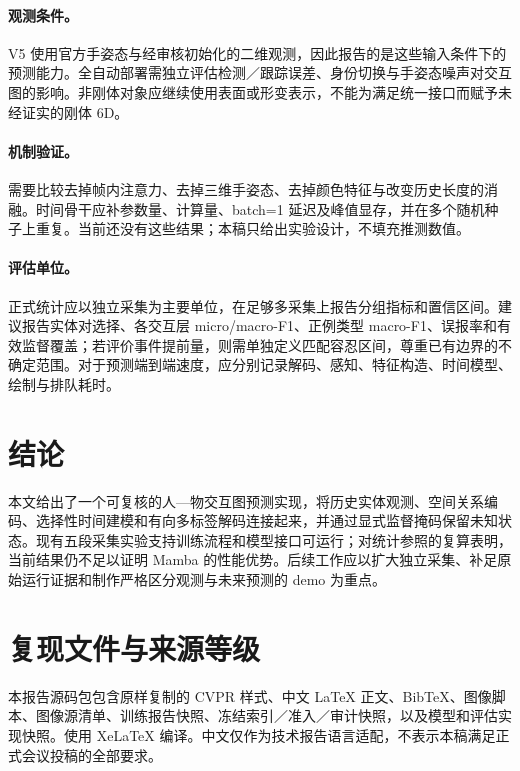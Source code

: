 \documentclass[10pt,twocolumn,letterpaper]{article}
\begin{document}
\paragraph{观测条件。}
V5 使用官方手姿态与经审核初始化的二维观测，因此报告的是这些输入条件下的预测能力。全自动部署需独立评估检测／跟踪误差、身份切换与手姿态噪声对交互图的影响。非刚体对象应继续使用表面或形变表示，不能为满足统一接口而赋予未经证实的刚体 6D。

\paragraph{机制验证。}
需要比较去掉帧内注意力、去掉三维手姿态、去掉颜色特征与改变历史长度的消融。时间骨干应补参数量、计算量、batch=1 延迟及峰值显存，并在多个随机种子上重复。当前还没有这些结果；本稿只给出实验设计，不填充推测数值。

\paragraph{评估单位。}
正式统计应以独立采集为主要单位，在足够多采集上报告分组指标和置信区间。建议报告实体对选择、各交互层 micro/macro-F1、正例类型 macro-F1、误报率和有效监督覆盖；若评价事件提前量，则需单独定义匹配容忍区间，尊重已有边界的不确定范围。对于预测端到端速度，应分别记录解码、感知、特征构造、时间模型、绘制与排队耗时。

\section{结论}
本文给出了一个可复核的人—物交互图预测实现，将历史实体观测、空间关系编码、选择性时间建模和有向多标签解码连接起来，并通过显式监督掩码保留未知状态。现有五段采集实验支持训练流程和模型接口可运行；对统计参照的复算表明，当前结果仍不足以证明 Mamba 的性能优势。后续工作应以扩大独立采集、补足原始运行证据和制作严格区分观测与未来预测的 demo 为重点。

{\small


}

\clearpage
\appendix
\balance
\section{复现文件与来源等级}
本报告源码包包含原样复制的 CVPR 样式、中文 LaTeX 正文、BibTeX、图像脚本、图像源清单、训练报告快照、冻结索引／准入／审计快照，以及模型和评估实现快照。使用 XeLaTeX 编译。中文仅作为技术报告语言适配，不表示本稿满足正式会议投稿的全部要求。
\end{document}
